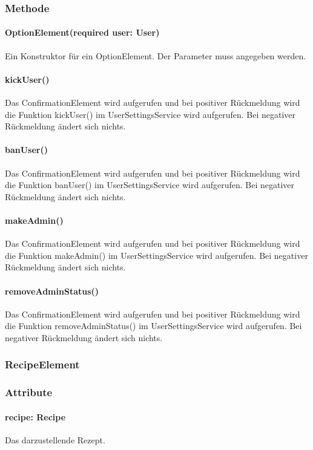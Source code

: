 \documentclass{entwurfsheft}
\begin{document}
\subsubsection*{Methode}
\paragraph*{OptionElement(required user: User)} Ein Konstruktor für ein OptionElement. Der Parameter muss angegeben werden.
\paragraph*{kickUser()} Das ConfirmationElement wird aufgerufen und bei positiver Rückmeldung wird die Funktion kickUser() im UserSettingsService wird aufgerufen. Bei negativer Rückmeldung ändert sich nichts.
\paragraph*{banUser()} Das ConfirmationElement wird aufgerufen und bei positiver Rückmeldung wird die Funktion banUser() im UserSettingsService wird aufgerufen. Bei negativer Rückmeldung ändert sich nichts.
\paragraph*{makeAdmin()} Das ConfirmationElement wird aufgerufen und bei positiver Rückmeldung wird die Funktion makeAdmin() im UserSettingsService wird aufgerufen. Bei negativer Rückmeldung ändert sich nichts.
\paragraph*{removeAdminStatus()} Das ConfirmationElement wird aufgerufen und bei positiver Rückmeldung wird die Funktion removeAdminStatus() im UserSettingsService wird aufgerufen. Bei negativer Rückmeldung ändert sich nichts.


\subsubsection{RecipeElement}\label{sec:RecipeElement}
\subsubsection*{Attribute}
\paragraph*{recipe: Recipe} Das darzustellende Rezept.
\end{document}
